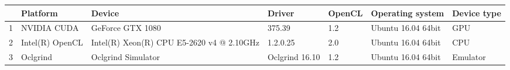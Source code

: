 \begin{tabular}{lllllll}
\toprule
{} &         Platform &                                     Device &          Driver & OpenCL &    Operating system & Device type \\
\midrule
1 &      NVIDIA CUDA &                           GeForce GTX 1080 &          375.39 &    1.2 &  Ubuntu 16.04 64bit &         GPU \\
2 &  Intel(R) OpenCL &  Intel(R) Xeon(R) CPU E5-2620 v4 @ 2.10GHz &        1.2.0.25 &    2.0 &  Ubuntu 16.04 64bit &         CPU \\
3 &         Oclgrind &                         Oclgrind Simulator &  Oclgrind 16.10 &    1.2 &  Ubuntu 16.04 64bit &    Emulator \\
\bottomrule
\end{tabular}
